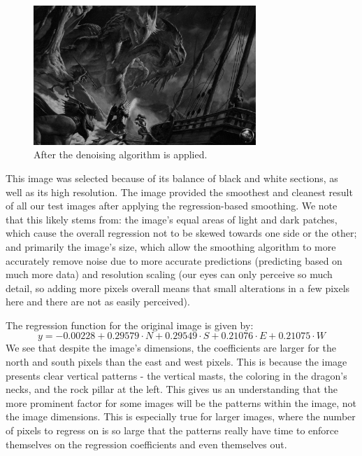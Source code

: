 \documentclass{article}
\begin{document}
\begin{figure}[H]
    \begin{center}
        \includegraphics[width=0.75\textwidth]{denoised_dragon.jpg}
    \end{center}
  \caption{After the denoising algorithm is applied.}
\end{figure}

This image was selected because of its balance of black and white sections, as well as its high resolution.  The image provided the smoothest and cleanest result of all our test images after applying the regression-based smoothing.  We note that this likely stems from: the image's equal areas of light and dark patches, which cause the overall regression not to be skewed towards one side or the other; and primarily the image's size, which allow the smoothing algorithm to more accurately remove noise due to more accurate predictions (predicting based on much more data) and resolution scaling (our eyes can only perceive so much detail, so adding more pixels overall means that small alterations in a few pixels here and there are not as easily perceived).

The regression function for the original image is given by:
\begin{equation}
y = -0.00228 + 0.29579 \cdot N + 0.29549 \cdot S + 0.21076 \cdot E + 0.21075 \cdot W
\end{equation}
We see that despite the image's dimensions, the coefficients are larger for the north and south pixels than the east and west pixels.  This is because the image presents clear vertical patterns - the vertical masts, the coloring in the dragon's necks, and the rock pillar at the left.  This gives us an understanding that the more prominent factor for some images will be the patterns within the image, not the image dimensions.  This is especially true for larger images, where the number of pixels to regress on is so large that the patterns really have time to enforce themselves on the regression coefficients and even themselves out.
\end{document}
